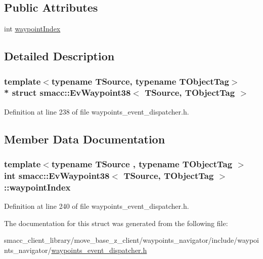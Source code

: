 \subsection*{Public Attributes}
\begin{DoxyCompactItemize}
\item 
int \hyperlink{structsmacc_1_1EvWaypoint38_ad4b429233b946a43df8f4f52b60d8723}{waypoint\+Index}
\end{DoxyCompactItemize}


\subsection{Detailed Description}
\subsubsection*{template$<$typename T\+Source, typename T\+Object\+Tag$>$\\*
struct smacc\+::\+Ev\+Waypoint38$<$ T\+Source, T\+Object\+Tag $>$}



Definition at line 238 of file waypoints\+\_\+event\+\_\+dispatcher.\+h.



\subsection{Member Data Documentation}
\subsubsection[{\texorpdfstring{waypoint\+Index}{waypointIndex}}]{\setlength{\rightskip}{0pt plus 5cm}template$<$typename T\+Source , typename T\+Object\+Tag $>$ int {\bf smacc\+::\+Ev\+Waypoint38}$<$ T\+Source, T\+Object\+Tag $>$\+::waypoint\+Index}\hypertarget{structsmacc_1_1EvWaypoint38_ad4b429233b946a43df8f4f52b60d8723}{}\label{structsmacc_1_1EvWaypoint38_ad4b429233b946a43df8f4f52b60d8723}


Definition at line 240 of file waypoints\+\_\+event\+\_\+dispatcher.\+h.



The documentation for this struct was generated from the following file\+:\begin{DoxyCompactItemize}
\item 
smacc\+\_\+client\+\_\+library/move\+\_\+base\+\_\+z\+\_\+client/waypoints\+\_\+navigator/include/waypoints\+\_\+navigator/\hyperlink{waypoints__event__dispatcher_8h}{waypoints\+\_\+event\+\_\+dispatcher.\+h}\end{DoxyCompactItemize}
